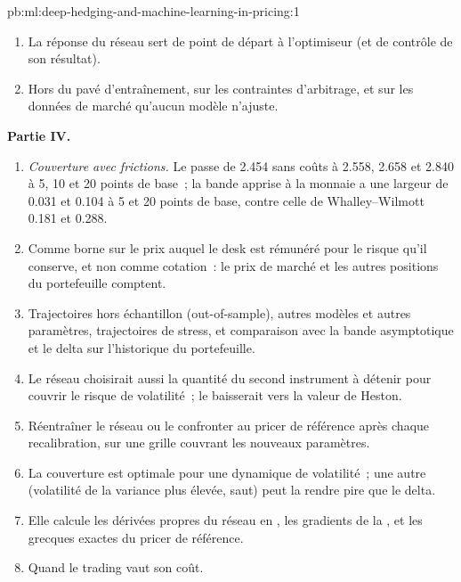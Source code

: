 \begin{solution}{pb:ml:deep-hedging-and-machine-learning-in-pricing:1}
\begin{enumerate}[resume]
les surfaces repricées, 0.46 points de volatilité implicite sur cinq surfaces.
\item La réponse du réseau sert de point de départ à l'optimiseur (et de contrôle de son résultat).
\item Hors du pavé d'entraînement, sur les contraintes d'arbitrage, et sur les données de marché qu'aucun modèle n'ajuste.
\end{enumerate}
\textbf{Partie IV.}
\begin{enumerate}[resume]
\item \emph{Couverture avec frictions.} Le  passe de 2.454 sans coûts à 2.558, 2.658 et 2.840 à 5, 10
et 20 points de base~; la bande apprise à la monnaie a une largeur de 0.031 et 0.104 à 5 et 20 points de base, contre celle de Whalley--Wilmott
0.181 et 0.288.
\item Comme borne sur le prix auquel le desk est rémunéré pour le risque qu'il conserve, et non comme cotation~: le prix de marché et
les autres positions du portefeuille comptent.
\item Trajectoires hors échantillon (out-of-sample), autres modèles et autres paramètres, trajectoires de stress, et comparaison avec la bande asymptotique et le delta
sur l'historique du portefeuille.
\item Le réseau choisirait aussi la quantité du second instrument à détenir pour couvrir le risque de volatilité~; le 
baisserait vers la valeur de Heston.
\item Réentraîner le réseau ou le confronter au pricer de référence après chaque recalibration, sur une grille couvrant les nouveaux paramètres.
\item La couverture est optimale pour une dynamique de volatilité~; une autre (volatilité de la variance plus élevée, saut) peut la rendre
pire que le delta.
\item Elle calcule les dérivées propres du réseau en , les gradients de la , et les
grecques exactes du pricer de référence.
\item Quand le trading vaut son coût.
\end{enumerate}
\end{solution}

